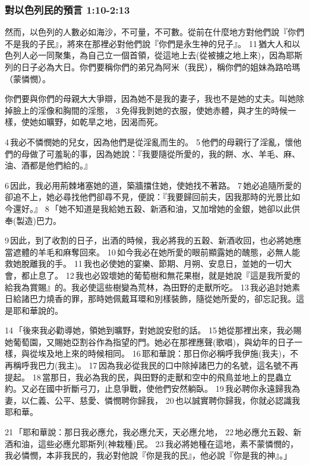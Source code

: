 \subsubsection{對以色列民的預言 1:10-2:13}
然而，以色列的人數必如海沙，不可量，不可數。從前在什麼地方對他們說『你們不是我的子民』，將來在那裡必對他們說『你們是永生神的兒子』。 11 猶大人和以色列人必一同聚集，為自己立一個首領，從這地上去(從被擄之地上來)，因為耶斯列的日子必為大日。你們要稱你們的弟兄為阿米（我民），稱你們的姐妹為路哈瑪（蒙憐憫）。

你們要與你們的母親大大爭辯，因為她不是我的妻子，我也不是她的丈夫。叫她除掉臉上的淫像和胸間的淫態， 3 免得我剝她的衣服，使她赤體，與才生的時候一樣，使她如曠野，如乾旱之地，因渴而死。 

4 我必不憐憫她的兒女，因為他們是從淫亂而生的。 5 他們的母親行了淫亂，懷他們的母做了可羞恥的事，因為她說：『我要隨從所愛的，我的餅、水、羊毛、麻、油、酒都是他們給的。』 

6 因此，我必用荊棘堵塞她的道，築牆擋住她，使她找不著路。 7 她必追隨所愛的卻追不上，她必尋找他們卻尋不見，便說：『我要歸回前夫，因我那時的光景比如今還好。』 8 「她不知道是我給她五穀、新酒和油，又加增她的金銀，她卻以此供奉(製造)巴力。 

9 因此，到了收割的日子，出酒的時候，我必將我的五穀、新酒收回，也必將她應當遮體的羊毛和麻奪回來。 10 如今我必在她所愛的眼前顯露她的醜態，必無人能救她脫離我的手。 11 我也必使她的宴樂、節期、月朔、安息日，並她的一切大會，都止息了。 12 我也必毀壞她的葡萄樹和無花果樹，就是她說『這是我所愛的給我為賞賜』的。我必使這些樹變為荒林，為田野的走獸所吃。 13 我必追討她素日給諸巴力燒香的罪，那時她佩戴耳環和別樣裝飾，隨從她所愛的，卻忘記我。這是耶和華說的。

14 「後來我必勸導她，領她到曠野，對她說安慰的話。 15 她從那裡出來，我必賜她葡萄園，又賜她亞割谷作為指望的門。她必在那裡應聲(歌唱)，與幼年的日子一樣，與從埃及地上來的時候相同。 16 耶和華說：那日你必稱呼我伊施(我夫)，不再稱呼我巴力(我主)。 17 因為我必從我民的口中除掉諸巴力的名號，這名號不再提起。 18 當那日，我必為我的民，與田野的走獸和空中的飛鳥並地上的昆蟲立約。又必在國中折斷弓刀，止息爭戰，使他們安然躺臥。 19 我必聘你永遠歸我為妻，以仁義、公平、慈愛、憐憫聘你歸我， 20 也以誠實聘你歸我，你就必認識我耶和華。

21 「耶和華說：那日我必應允，我必應允天，天必應允地， 22 地必應允五穀、新酒和油，這些必應允耶斯列(神栽種)民。 23 我必將她種在這地，素不蒙憐憫的，我必憐憫，本非我民的，我必對他說『你是我的民』，他必說『你是我的神』。」


